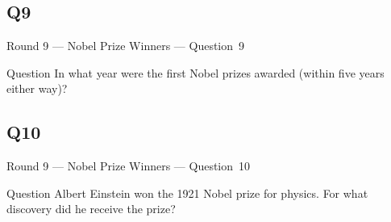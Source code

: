 \documentclass[11pt,draft]{beamer}
\begin{document}
\subsection*{Q9}
\begin{frame}[t]{Round 9 --- Nobel Prize Winners --- \mbox{Question 9}}
    \begin{block}{Question}
        In what year were the first Nobel prizes awarded (within five years either way)?
    \end{block}
\end{frame}
\subsection*{Q10}
\begin{frame}[t]{Round 9 --- Nobel Prize Winners --- \mbox{Question 10}}
    \begin{block}{Question}
        Albert Einstein won the 1921 Nobel prize for physics. For what discovery did he receive the prize?
    \end{block}
\end{frame}
\end{document}
